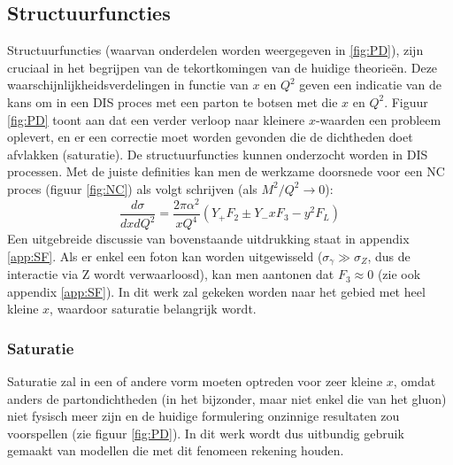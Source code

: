 \documentclass[a4paper,11pt]{article}
\numberwithin{equation}{section} %
\begin{document}
    \subsection{Structuurfuncties}
Structuurfuncties (waarvan onderdelen worden weergegeven in \ref{fig:PD}), zijn cruciaal in het begrijpen van de tekortkomingen van de huidige theorieën.
Deze waarschijnlijkheidsverdelingen in functie van $x$ en $Q^2$  geven een indicatie van de kans om in een DIS proces met een parton te botsen met die $x$ en $Q^2$.
Figuur \ref{fig:PD} toont aan dat een verder verloop naar kleinere $x$-waarden een probleem oplevert, en er een correctie moet worden gevonden die de dichtheden doet afvlakken (saturatie).
De structuurfuncties kunnen onderzocht worden in DIS processen.
Met de juiste definities kan men de werkzame doorsnede voor een NC proces (figuur \ref{fig:NC}) als volgt schrijven (als $M^2/Q^2 \rightarrow 0$):
\begin{equation} \label{eq:SF}
\frac{d\sigma}{dxdQ^2} = \frac{2\pi \alpha^2}{xQ^4} \left(Y_+ F_2 \pm Y_- x F_3 - y^2 F_L \right)
\end{equation}
Een uitgebreide discussie van bovenstaande uitdrukking staat in appendix \ref{app:SF}.
Als er enkel een foton kan worden uitgewisseld ($\sigma_\gamma \gg \sigma_Z$, dus de interactie via Z wordt verwaarloosd), kan men aantonen dat $F_3 \approx 0$ (zie ook appendix \ref{app:SF}).
In dit werk zal gekeken worden naar het gebied met heel kleine $x$, waardoor saturatie belangrijk wordt.

    \subsubsection{Saturatie} \label{sec:Saturatie}
Saturatie zal in een of andere vorm moeten optreden voor zeer kleine $x$, omdat anders de partondichtheden (in het bijzonder, maar niet enkel die van het gluon) niet fysisch meer zijn en de huidige formulering onzinnige resultaten zou voorspellen (zie figuur \ref{fig:PD}).
In dit werk wordt dus uitbundig gebruik gemaakt van modellen die met dit fenomeen rekening houden.
\end{document}
